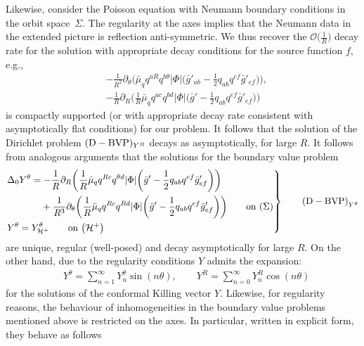 \documentclass[11pt]{article}
\numberwithin{equation}{section}
\def\ptl{\partial}%
\def\halb{\frac{1}{2}}%
\numberwithin{equation}{section}
\begin{document}
Likewise, consider the Poisson equation with Neumann boundary conditions in the orbit space~$\Sigma$. The regularity at the axes implies that the Neumann data in the extended picture is reflection anti-symmetric. We thus recover the $\mathcal{O} \bigl(\frac{1}{R}\bigr)$ decay rate for the solution with appropriate decay conditions for the source function $f$, e.g.,
\begin{align*}
&-\frac{1}{R^2} \ptl_ \theta \biggl(\bar{\mu}_q q^{aR} q^{b \theta} \vert \Phi \vert \biggl(\bar{g}'_{ab} - \halb q_{ab} q^{ef} \bar{g}'_{ef}\biggr)\biggr), \\
&- \frac{1}{R} \ptl_R \biggl(\frac{1}{R} \bar{\mu}_q q^{ac} q^{bd} \vert \Phi \vert \biggl(\bar{g}' - \halb q_{ab} q^{ef} \bar{g}'_{ef}\biggr)\biggr)
\end{align*}
is compactly supported (or with appropriate decay rate consistent with asymptotically flat conditions) for our problem.
It follows that the solution of the Dirichlet problem $({\rm D-BVP})_{Y^R}$ decays as
 asymptotically, for large $R$. It follows from analogous arguments that the solutions for the boundary value problem
\begin{equation*}
\left.\begin{aligned}
&\Delta_0 Y^\theta= - \frac{1}{R} \ptl_R \biggl(\frac{1}{R} \bar{\mu}_q q^{Rc} q^{\theta d} \vert \Phi \vert \biggl(\bar{g}' - \halb q_{ab} q^{ef} \bar{g}'_{ef}\biggr)\biggr)
\notag\\
&\hphantom{\Delta_0 Y^\theta=}{}
+ \frac{1}{R^3} \ptl_\theta \biggl(\frac{1}{R} \bar{\mu}_q q^{Rc} q^{Rd} \vert \Phi \vert \biggl(\bar{g}' - \halb q_{ab} q^{ef} \bar{g}'_{ef}\biggr)\biggr) \qquad \text{on} \ (\Sigma)\\
&Y^\theta= Y^\theta_{\mathcal{H}^+} \qquad \text{on} \ \bigl(\mathcal{H}^+\bigr)
\end{aligned}
 \right\}
\tag*{${\rm (D-BVP)}_{Y^\theta}$}
\end{equation*}
are unique, regular (well-posed) and decay  asymptotically for large $R$.
On the other hand, due to the regularity conditions $Y$ admits the expansion:
	\begin{align*}
	&Y^{\theta}= \sum^{\infty}_{n=1} Y^{\theta}_n \sin (n \theta), \qquad
	Y^{R}= \sum^{\infty}_{n=0} Y^R_n \cos(n \theta)
	\end{align*}
for the solutions of the conformal Killing vector $Y$. Likewise, for regularity reasons, the behaviour of inhomogeneities in the boundary value problems mentioned above is restricted on the axes. In particular, written in explicit form, they behave as follows
\end{document}
